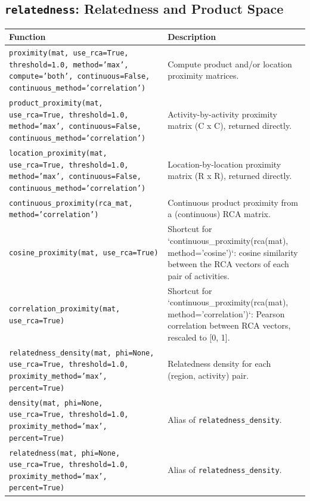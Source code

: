 \subsection{\texttt{relatedness}: Relatedness and Product Space}
\begin{longtable}{>{\raggedright\arraybackslash}p{9.2cm} >{\raggedright\arraybackslash}p{7.0cm}}
\toprule
\textbf{Function} & \textbf{Description} \\
\midrule\endhead
\texttt{\footnotesize proximity(mat, use\_rca=True, threshold=1.0, method='max', compute='both', continuous=False, continuous\_method='correlation')} & {\small Compute product and/or location proximity matrices.} \\[2pt]
\texttt{\footnotesize product\_proximity(mat, use\_rca=True, threshold=1.0, method='max', continuous=False, continuous\_method='correlation')} & {\small Activity-by-activity proximity matrix (C x C), returned directly.} \\[2pt]
\texttt{\footnotesize location\_proximity(mat, use\_rca=True, threshold=1.0, method='max', continuous=False, continuous\_method='correlation')} & {\small Location-by-location proximity matrix (R x R), returned directly.} \\[2pt]
\texttt{\footnotesize continuous\_proximity(rca\_mat, method='correlation')} & {\small Continuous product proximity from a (continuous) RCA matrix.} \\[2pt]
\texttt{\footnotesize cosine\_proximity(mat, use\_rca=True)} & {\small Shortcut for `continuous\_proximity(rca(mat), method='cosine')`: cosine similarity between the RCA vectors of each pair of activities.} \\[2pt]
\texttt{\footnotesize correlation\_proximity(mat, use\_rca=True)} & {\small Shortcut for `continuous\_proximity(rca(mat), method='correlation')`: Pearson correlation between RCA vectors, rescaled to [0, 1].} \\[2pt]
\texttt{\footnotesize relatedness\_density(mat, phi=None, use\_rca=True, threshold=1.0, proximity\_method='max', percent=True)} & {\small Relatedness density for each (region, activity) pair.} \\[2pt]
\texttt{\footnotesize density(mat, phi=None, use\_rca=True, threshold=1.0, proximity\_method='max', percent=True)} & {\small Alias of \texttt{relatedness\_density}.} \\[2pt]
\texttt{\footnotesize relatedness(mat, phi=None, use\_rca=True, threshold=1.0, proximity\_method='max', percent=True)} & {\small Alias of \texttt{relatedness\_density}.} \\[2pt]

\end{longtable}
